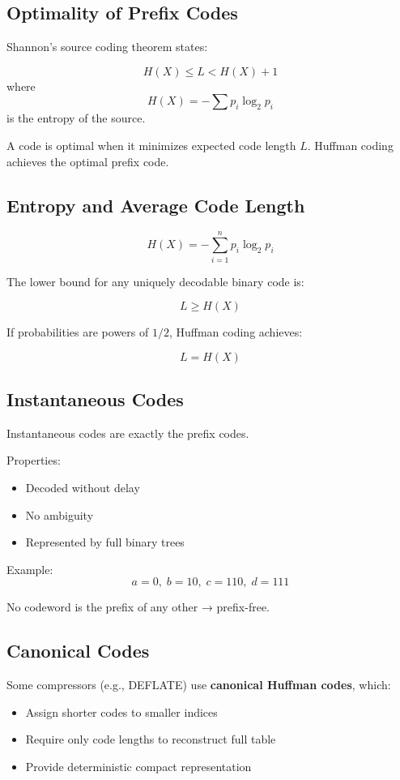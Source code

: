 \documentclass{AnantDocumentation}
\begin{document}
\subsection{Optimality of Prefix Codes}

Shannon’s source coding theorem states:

\[
\boxed{H(X) \le L < H(X) + 1}
\]
where
\[
H(X) = -\sum p_i \log_2 p_i
\]
is the entropy of the source.

A code is optimal when it minimizes expected code length \(L\).  
Huffman coding achieves the optimal prefix code.

\subsection{Entropy and Average Code Length}

\[
H(X) = -\sum_{i=1}^{n} p_i \log_2 p_i
\]

The lower bound for any uniquely decodable binary code is:

\[
L \ge H(X)
\]

If probabilities are powers of \(1/2\), Huffman coding achieves:

\[
L = H(X)
\]

\subsection{Instantaneous Codes}

Instantaneous codes are exactly the prefix codes.

Properties:
\begin{itemize}
\item Decoded without delay
\item No ambiguity
\item Represented by full binary trees
\end{itemize}

Example:
\[
a = 0,\; b = 10,\; c = 110,\; d = 111
\]

No codeword is the prefix of any other → prefix-free.

\subsection{Canonical Codes}

Some compressors (e.g., DEFLATE) use \textbf{canonical Huffman codes}, which:
\begin{itemize}
\item Assign shorter codes to smaller indices
\item Require only code lengths to reconstruct full table
\item Provide deterministic compact representation
\end{itemize}
\end{document}
